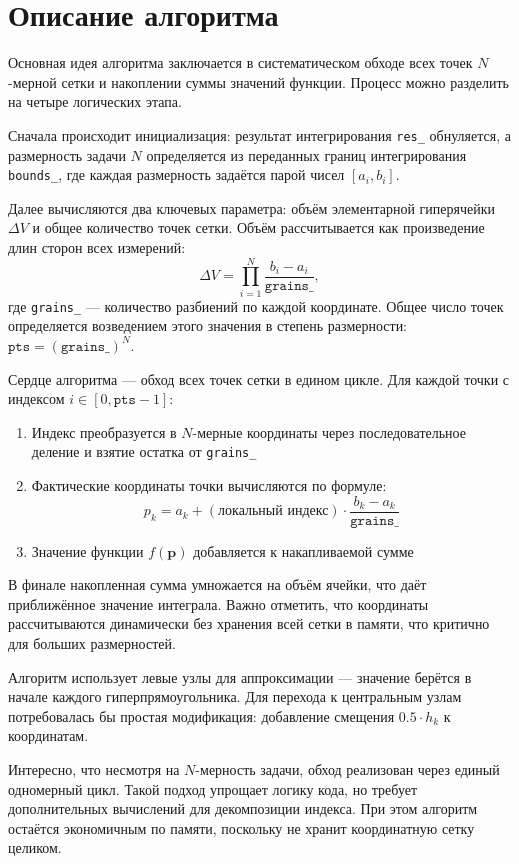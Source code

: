 \documentclass[12pt,a4paper]{extarticle}
\begin{document}
\newpage
\section{Описание алгоритма}

Основная идея алгоритма заключается в систематическом обходе всех точек $N$-мерной сетки и накоплении суммы значений функции. Процесс можно разделить на четыре логических этапа.

Сначала происходит инициализация: результат интегрирования \texttt{res\_} обнуляется, а размерность задачи $N$ определяется из переданных границ интегрирования \texttt{bounds\_}, где каждая размерность задаётся парой чисел $[a_i, b_i]$.

Далее вычисляются два ключевых параметра: объём элементарной гиперячейки $\Delta V$ и общее количество точек сетки. Объём рассчитывается как произведение длин сторон всех измерений:
\[
\Delta V = \prod_{i=1}^{N} \frac{b_i - a_i}{\texttt{grains\_}},
\]
где \texttt{grains\_} — количество разбиений по каждой координате. Общее число точек определяется возведением этого значения в степень размерности: $\texttt{pts} = (\texttt{grains\_})^N$.

Сердце алгоритма — обход всех точек сетки в едином цикле. Для каждой точки с индексом $i \in [0, \texttt{pts}-1]$:
\begin{enumerate}
    \item Индекс преобразуется в $N$-мерные координаты через последовательное деление и взятие остатка от \texttt{grains\_}
    \item Фактические координаты точки вычисляются по формуле: 
    \[
    p_k = a_k + (\text{локальный индекс}) \cdot \frac{b_k - a_k}{\texttt{grains\_}}
    \]
    \item Значение функции $f(\mathbf{p})$ добавляется к накапливаемой сумме
\end{enumerate}

В финале накопленная сумма умножается на объём ячейки, что даёт приближённое значение интеграла. Важно отметить, что координаты рассчитываются динамически без хранения всей сетки в памяти, что критично для больших размерностей.

Алгоритм использует левые узлы для аппроксимации — значение берётся в начале каждого гиперпрямоугольника. Для перехода к центральным узлам потребовалась бы простая модификация: добавление смещения $0.5 \cdot h_k$ к координатам. 

Интересно, что несмотря на $N$-мерность задачи, обход реализован через единый одномерный цикл. Такой подход упрощает логику кода, но требует дополнительных вычислений для декомпозиции индекса. При этом алгоритм остаётся экономичным по памяти, поскольку не хранит координатную сетку целиком.
\end{document}
